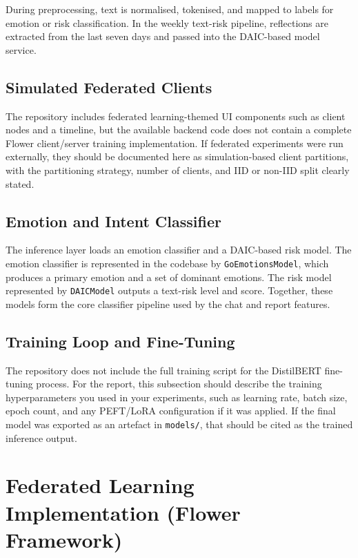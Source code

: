 During preprocessing, text is normalised, tokenised, and mapped to labels for emotion or risk classification. In the weekly text-risk pipeline, reflections are extracted from the last seven days and passed into the DAIC-based model service.

\subsection{Simulated Federated Clients}

The repository includes federated learning-themed UI components such as client nodes and a timeline, but the available backend code does not contain a complete Flower client/server training implementation. If federated experiments were run externally, they should be documented here as simulation-based client partitions, with the partitioning strategy, number of clients, and IID or non-IID split clearly stated.

\subsection{Emotion and Intent Classifier}

The inference layer loads an emotion classifier and a DAIC-based risk model. The emotion classifier is represented in the codebase by \texttt{GoEmotionsModel}, which produces a primary emotion and a set of dominant emotions. The risk model represented by \texttt{DAICModel} outputs a text-risk level and score. Together, these models form the core classifier pipeline used by the chat and report features.

\subsection{Training Loop and Fine-Tuning}

The repository does not include the full training script for the DistilBERT fine-tuning process. For the report, this subsection should describe the training hyperparameters you used in your experiments, such as learning rate, batch size, epoch count, and any PEFT/LoRA configuration if it was applied. If the final model was exported as an artefact in \texttt{models/}, that should be cited as the trained inference output.

\section{Federated Learning Implementation (Flower Framework)}

